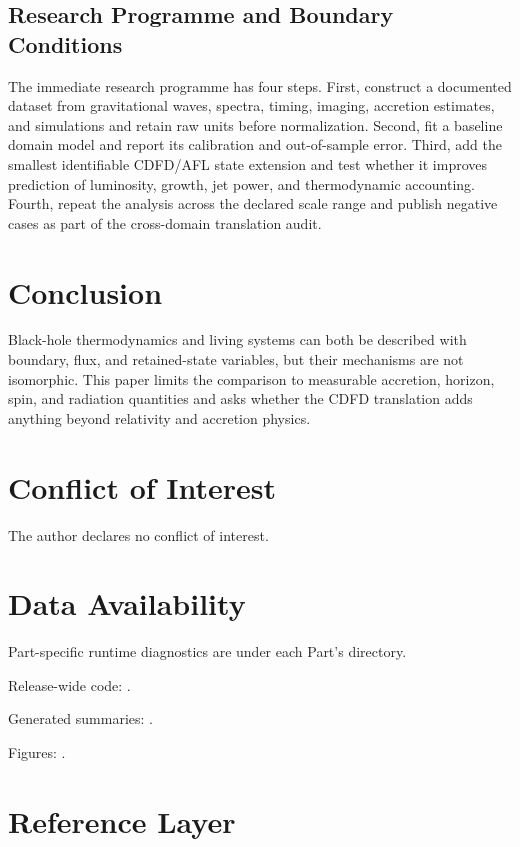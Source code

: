 \documentclass[11pt,a4paper]{article}
\begin{document}
\subsection{Research Programme and Boundary Conditions}

The immediate research programme has four steps. First, construct a documented
dataset from gravitational waves, spectra, timing, imaging, accretion estimates, and simulations and retain raw units before normalization.
Second, fit a baseline domain model and report its calibration and out-of-sample
error. Third, add the smallest identifiable CDFD/AFL state extension and test
whether it improves prediction of luminosity, growth, jet power, and thermodynamic accounting. Fourth, repeat the
analysis across the declared scale range and publish negative cases as part of
the cross-domain translation audit.


\section{Conclusion}
Black-hole thermodynamics and living systems can both be described with boundary, flux, and retained-state variables, but their mechanisms are not isomorphic. This paper limits the comparison to measurable accretion, horizon, spin, and radiation quantities and asks whether the CDFD translation adds anything beyond relativity and accretion physics.
\section*{Conflict of Interest} The author declares no conflict of interest.
\section*{Data Availability}
Part-specific runtime diagnostics are under each Part's  directory.

Release-wide code: .

Generated summaries: .

Figures: .


\section{Reference Layer}


\end{document}
